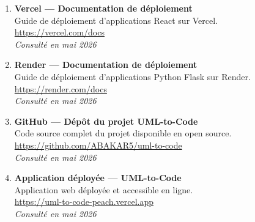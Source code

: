 \begin{enumerate}
\item \textbf{Vercel — Documentation de déploiement}\\
Guide de déploiement d'applications React sur Vercel.\\
\url{https://vercel.com/docs}\\
\textit{Consulté en mai 2026}

\item \textbf{Render — Documentation de déploiement}\\
Guide de déploiement d'applications Python Flask sur Render.\\
\url{https://render.com/docs}\\
\textit{Consulté en mai 2026}

\item \textbf{GitHub — Dépôt du projet UML-to-Code}\\
Code source complet du projet disponible en open source.\\
\url{https://github.com/ABAKAR5/uml-to-code}\\
\textit{Consulté en mai 2026}

\item \textbf{Application déployée — UML-to-Code}\\
Application web déployée et accessible en ligne.\\
\url{https://uml-to-code-peach.vercel.app}\\
\textit{Consulté en mai 2026}

\end{enumerate}